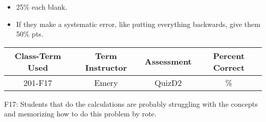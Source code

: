 \begin{rubric}
	\begin{itemize}
		\item 25\% each blank.
		\item If they make a systematic error, like putting everything backwards, give them 50\% pts.
	\end{itemize}
\end{rubric}

\begin{outcomes}
	\begin{center}
		\begin{tabular}{cccc}
			\hline\hline
			Class-Term Used & Term Instructor & Assessment & Percent Correct\\
			\hline
			201-F17 & Emery & QuizD2 & \%\\
			\hline
		\end{tabular}
	\end{center}
\end{outcomes}

\begin{comments}

F17: Students that do the calculations are probably struggling with the concepts and memorizing how to do this problem by rote.

\end{comments}